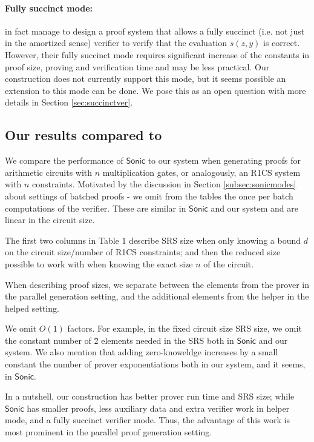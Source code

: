 \documentclass[11pt]{article}
\numberwithin{figure}{section} %
\newcommand{\sonic}{\ensuremath{\mathsf{Sonic}}\xspace}
\begin{document}
\paragraph{Fully succinct mode:}
\cite{sonic} in fact manage to design a proof system that allows a fully succinct (i.e. not just in the amortized sense) verifier to verify that the evaluation $s(z,y)$ is correct. However, their fully succinct mode requires significant increase of the constants in  proof size, proving and verification time and may be less practical.
Our construction does not currently support this mode, but it seems possible an extension to this mode can be done.
We pose this as an open question with more details in Section \ref{sec:succinctver}.

\subsection{Our results compared to \cite{sonic}}
\newcommand{\obgen}{\ensuremath{\mathcal O}\xspace}

We compare the performance of \sonic to our system when generating proofs for arithmetic circuits with $n$ multiplication gates, or analogously, an R1CS system with $n$ constraints.
Motivated by the discussion in Section \ref{subsec:sonicmodes} about settings of batched proofs - we omit from the tables the once per batch computations of the verifier. These are similar in \sonic and our system and are linear in the circuit size.

The first two columns in Table $1$ describe SRS size when only knowing a bound $d$ on the circuit size/number of R1CS constraints; and then the reduced size possible to work with when knowing the exact size $n$ of the circuit.

When describing proof sizes, we separate between the elements from the prover in the parallel generation setting, and the additional elements from the helper in the helped setting.

We omit $O(1)$ factors. For example, in the fixed circuit size SRS size, we omit the constant number of \G2 elements needed in the SRS both in \sonic and our system. We also mention that adding zero-knoweldge increases by a small constant the number of prover exponentiations both in our system, and it seems, in \sonic.

In a nutshell, our construction has better prover run time and SRS size; while \sonic has smaller proofs, less auxiliary data and extra verifier work in helper mode, and a fully succinct verifier mode. Thus, the advantage of this work is most prominent in the parallel proof generation setting.
\end{document}
